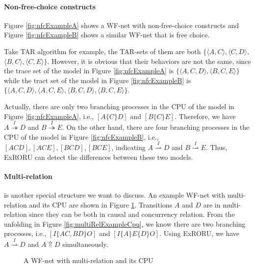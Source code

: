 \documentclass[dvips,...]{llncs}
\begin{document}
\paragraph{Non-free-choice constructs}\label{par:nfc} 
Figure \ref{fig:nfcExampleA} shows a WF-net with non-free-choice constructs \cite{de2003workflow} and Figure \ref{fig:nfcExampleB} shows a similar WF-net that is free choice.

Take TAR algorithm for example, the TAR-sets of them are both $\{\langle A,C\rangle, \langle C,D\rangle$, $\langle B,C\rangle, \langle C,E\rangle\}$. However, it is obvious that their behaviors are not the same, since the trace set of the model in Figure \ref{fig:nfcExampleA} is $\{\langle A,C,D\rangle,\langle B,C,E\rangle\}$ while the tract set of the model in Figure \ref{fig:nfcExampleB} is $\{\langle A,C,D\rangle,\langle A,C,E\rangle,\langle B,C,D\rangle,\langle B,C,E\rangle\}$.

Actually, there are only two branching processes in the CPU of the model in Figure \ref{fig:nfcExampleA}, i.e., $[A\{C\}D]$ and $[B\{C\}E]$. Therefore, we have $A\overset{I}{\twoheadrightarrow}D$ and $B\overset{I}{\twoheadrightarrow}E$. On the other hand, there are four branching processes in the CPU of the model in Figure \ref{fig:nfcExampleB}, i.e., $[ACD],[ACE],[BCD],[BCE]$, indicating $A\overset{I}{\rightharpoonup}D$ and $B\overset{I}{\rightharpoonup}E$. Thus, ExRORU can detect the differences between these two models.

\paragraph{Multi-relation} is another special structure we want to discuss. An example WF-net with multi-relation and its CPU are shown in Figure \ref{fig:exampleMultiRelation}. Transitions $A$ and $D$ are in multi-relation since they can be both in causal and concurrency relation. From the unfolding in Figure \ref{fig:multiRelExampleCpu}, we know there are two branching processes, i.e., $[I\{AC,BD\}O]$ and $[I\{A\}E\{D\}O]$. Using ExRORU, we have $A\overset{I}{\rightharpoonup}D$ and $A\Uparrow D$ simultaneously.

\begin{figure}[htbp]
\centering
{}
\caption{A WF-net with multi-relation and its CPU\label{fig:exampleMultiRelation}}
\end{figure}
\end{document}
